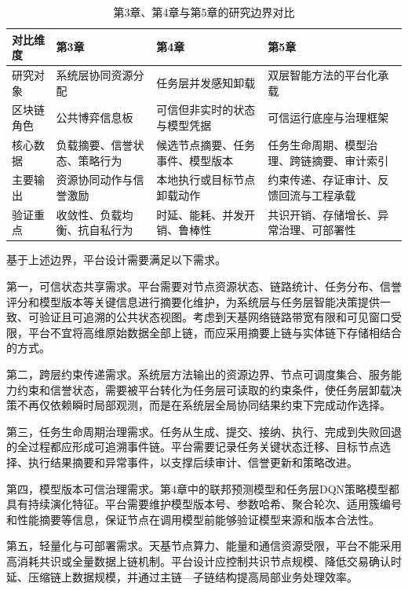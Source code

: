 \begin{table}[htbp]
  \centering
  \caption{第3章、第4章与第5章的研究边界对比}
  \label{tab:chapter_boundary}
  \begin{tabular}{p{2.2cm}p{3.5cm}p{3.5cm}p{3.8cm}}
    \toprule
    对比维度 & 第3章 & 第4章 & 第5章 \\
    \midrule
    研究对象 & 系统层协同资源分配 & 任务层并发感知卸载 & 双层智能方法的平台化承载 \\
    区块链角色 & 公共博弈信息板 & 可信但非实时的状态与模型凭据 & 可信运行底座与治理框架 \\
    核心数据 & 负载摘要、信誉状态、策略行为 & 候选节点摘要、任务事件、模型版本 & 任务生命周期、模型治理、跨链摘要、审计索引 \\
    主要输出 & 资源协同动作与信誉激励 & 本地执行或目标节点卸载动作 & 约束传递、存证审计、反馈回流与工程承载 \\
    验证重点 & 收敛性、负载均衡、抗自私行为 & 时延、能耗、并发开销、鲁棒性 & 共识开销、存储增长、异常治理、可部署性 \\
    \bottomrule
  \end{tabular}
\end{table}

基于上述边界，平台设计需要满足以下需求。

第一，可信状态共享需求。平台需要对节点资源状态、链路统计、任务分布、信誉评分和模型版本等关键信息进行摘要化维护，为系统层与任务层智能决策提供一致、可验证且可追溯的公共状态视图。考虑到天基网络链路带宽有限和可见窗口受限，平台不宜将高维原始数据全部上链，而应采用摘要上链与实体链下存储相结合的方式。

第二，跨层约束传递需求。系统层方法输出的资源边界、节点可调度集合、服务能力约束和信誉状态，需要被平台转化为任务层可读取的约束条件，使任务层卸载决策不再仅依赖瞬时局部观测，而是在系统层全局协同结果约束下完成动作选择。

第三，任务生命周期治理需求。任务从生成、提交、接纳、执行、完成到失败回退的全过程都应形成可追溯事件链。平台需要记录任务关键状态迁移、目标节点选择、执行结果摘要和异常事件，以支撑后续审计、信誉更新和策略改进。

第四，模型版本可信治理需求。第4章中的联邦预测模型和任务层DQN策略模型都具有持续演化特征。平台需要维护模型版本号、参数哈希、聚合轮次、适用簇编号和性能摘要等信息，保证节点在调用模型前能够验证模型来源和版本合法性。

第五，轻量化与可部署需求。天基节点算力、能量和通信资源受限，平台不能采用高消耗共识或全量数据上链机制。平台设计应控制共识节点规模、降低交易确认时延、压缩链上数据规模，并通过主链—子链结构提高局部业务处理效率。


